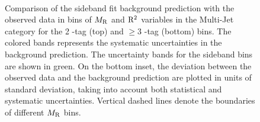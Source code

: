 \begin{figure}[!htb] \centering
{}\\
\caption{Comparison of the sideband fit background prediction with the observed data
  in bins of $M_\mathrm{R}$ and $\mathrm{R}^2$ variables in the Multi-Jet category for
  the 2 \PQb-tag (top) and $\geq 3$ \PQb-tag (bottom) bins. The colored bands represents the 
  systematic uncertainties in the background prediction. The uncertainty bands for the 
  sideband bins are shown in green. On the bottom inset, the deviation between the observed 
  data and the background prediction are plotted in units of standard deviation, taking into 
  account both statistical and systematic uncertainties. Vertical dashed lines denote the 
  boundaries of different $M_\mathrm{R}$ bins. }
\label{fig:results_Multijet2btag3btag}
\end{figure}
